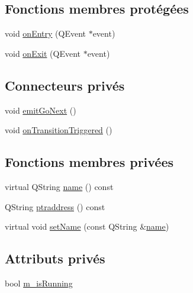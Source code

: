 \subsection*{Fonctions membres protégées}
\begin{DoxyCompactItemize}
\item 
void \hyperlink{classSH__GenericState_a68c67ef95738e01cd34cd5926f4932fb}{on\-Entry} (Q\-Event $\ast$event)
\item 
void \hyperlink{classSH__GenericState_a7f7863859318c70c9b734be5bf5510b0}{on\-Exit} (Q\-Event $\ast$event)
\end{DoxyCompactItemize}
\subsection*{Connecteurs privés}
\begin{DoxyCompactItemize}
\item 
void \hyperlink{classSH__GenericState_a66d4d4d94ef4fac3eb8d137848290582}{emit\-Go\-Next} ()
\item 
void \hyperlink{classSH__GenericState_aad4259cc1e6a51681d6a92e995486380}{on\-Transition\-Triggered} ()
\end{DoxyCompactItemize}
\subsection*{Fonctions membres privées}
\begin{DoxyCompactItemize}
\item 
virtual Q\-String \hyperlink{classSH__NamedObject_a9f686c6f2a5bcc08ad03d0cee0151f0f}{name} () const 
\item 
Q\-String \hyperlink{classSH__NamedObject_a147d0e52d9f0fc1d3a423d02f82325f5}{ptraddress} () const 
\item 
virtual void \hyperlink{classSH__NamedObject_a6bc164e6fa10ae190770529af75d1775}{set\-Name} (const Q\-String \&\hyperlink{classSH__NamedObject_a9f686c6f2a5bcc08ad03d0cee0151f0f}{name})
\end{DoxyCompactItemize}
\subsection*{Attributs privés}
\begin{DoxyCompactItemize}
\item 
bool \hyperlink{classSH__GenericState_a72ddc905cfbffbed48bb2f2474d5297a}{m\-\_\-is\-Running}
\end{DoxyCompactItemize}



